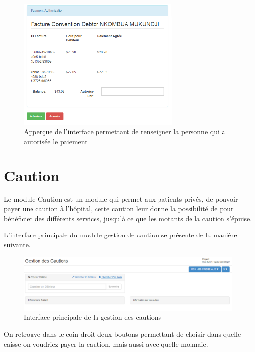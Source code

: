 \documentclass[12pt,a4paper]{report}
\begin{document}
\begin{figure}[h]
\begin{center}
\includegraphics[width=8cm]{pic/PCConfirm.png}
\end{center}
\caption{Apperçue de l'interface permettant de renseigner la personne qui a autorisée le paiement}
\label{Apperçue de l'interface permettant de renseigner la personne qui a autorisée le paiement}
\end{figure}
\newpage
\section{Caution}
Le module Caution est un module qui permet aux patients privés, de pouvoir payer une caution à l'hôpital, cette caution leur donne la possibilité de pour bénéficier des différents services, jusqu'à ce que les motants de la caution s'épuise.

L'interface principale du module gestion de caution se présente de la manière suivante.

\begin{figure}[h]
\begin{center}
\includegraphics[width=14cm]{pic/cautionInterface.png}
\end{center}
\caption{Interface principale de la gestion des cautions}
\label{Interface principale de la gestion des cautions}
\end{figure}

On retrouve dans le coin droit deux boutons permettant de choisir dans quelle caisse on voudriez payer la caution, mais aussi avec quelle monnaie. 
\end{document}
